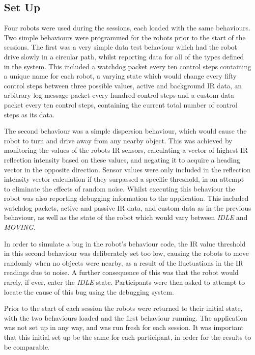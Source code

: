\subsection{Set Up}
Four robots were used during the sessions, each loaded with the same behaviours. Two simple behaviours were programmed for the robots prior to the start of the sessions. The first was a very simple data test behaviour which had the robot drive slowly in a circular path, whilst reporting data for all of the types defined in the system. This included a watchdog packet every ten control steps containing a unique name for each robot, a varying state which would change every fifty control steps between three possible values, active and background IR data, an arbitrary log message packet every hundred control steps and a custom data packet every ten control steps, containing the current total number of control steps as its data. 

The second behaviour was a simple dispersion behaviour, which would cause the robot to turn and drive away from any nearby object. This was achieved by monitoring the values of the robots IR sensors, calculating a vector of highest IR reflection intensity based on these values, and negating it to acquire a heading vector in the opposite direction. Sensor values were only included in the reflection intensity vector calculation if they surpassed a specific threshold, in an attempt to eliminate the effects of random noise. Whilst executing this behaviour the robot was also reporting debugging information to the application. This included watchdog packets, active and passive IR data, and custom data as in the previous behaviour, as well as the state of the robot which would vary between \textit{IDLE} and \textit{MOVING}. 

In order to simulate a bug in the robot's behaviour code, the IR value threshold in this second behaviour was deliberately set too low, causing the robots to move randomly when no objects were nearby, as a result of the fluctuations in the IR readings due to noise. A further consequence of this was that the robot would rarely, if ever, enter the \textit{IDLE} state. Participants were then asked to attempt to locate the cause of this bug using the debugging system.

Prior to the start of each session the robots were returned to their initial state, with the two behaviours loaded and the first behaviour running. The application was not set up in any way, and was run fresh for each session. It was important that this initial set up be the same for each participant, in order for the results to be comparable.

